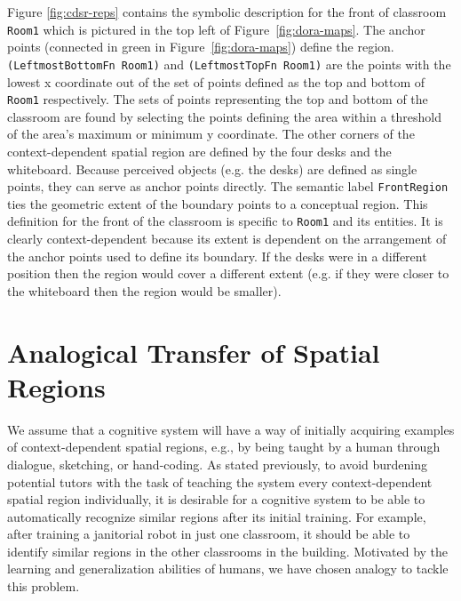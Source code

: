 \documentclass[letterpaper]{article}
\newcommand{\fw}[1]{\texttt{#1}}
\begin{document}
Figure \ref{fig:cdsr-reps} contains the symbolic description for the front of classroom \fw{Room1} which is pictured in the top left of Figure~\ref{fig:dora-maps}. The anchor points (connected in green in Figure~\ref{fig:dora-maps}) define the region. \fw{(LeftmostBottomFn Room1)} and \fw{(LeftmostTopFn Room1)} are the points with the lowest x coordinate out of the set of points defined as the top and bottom of \fw{Room1} respectively. The sets of points representing the top and bottom of the classroom are found by selecting the points defining the area within a threshold of the area's maximum or minimum y coordinate. The other corners of the context-dependent spatial region are defined by the four desks and the whiteboard. Because perceived objects (e.g. the desks) are defined as single points, they can serve as anchor points directly. The semantic label \fw{FrontRegion} ties the geometric extent of the boundary points to a conceptual region. This definition for the front of the classroom is specific to \fw{Room1} and its entities. It is clearly context-dependent because its extent is dependent on the arrangement of the anchor points used to define its boundary. If the desks were in a different position then the region would cover a different extent (e.g. if they were closer to the whiteboard then the region would be smaller). 



\section{Analogical Transfer of Spatial Regions}


We assume that a cognitive system will have a way of initially acquiring examples of context-dependent spatial regions, e.g., by being taught by a human through dialogue, sketching, or hand-coding. As stated previously, to avoid burdening potential tutors with the task of teaching the system every context-dependent spatial region individually, it is desirable for a cognitive system to be able to automatically recognize similar regions after its initial training. For example, after training a janitorial robot in just one classroom, it should be able to identify similar regions in the other classrooms in the building. Motivated by the learning and generalization abilities of humans, we have chosen analogy to tackle this problem.
\end{document}
